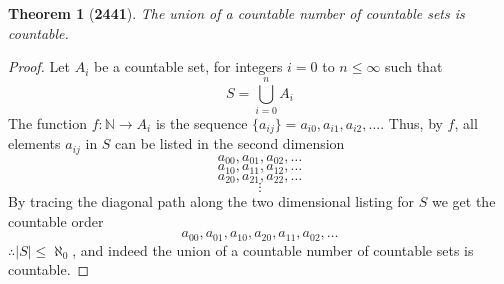 \documentclass[preview]{standalone}
\newtheorem{theorem}{Theorem}
\begin{document}
\begin{theorem}[\textbf{2441}]
    The union of a countable number of countable sets is countable.
\end{theorem}

\begin{proof}
    Let $A_i$ be a countable set, for integers $i=0$ to $n \leq \infty$ 
    such that
    $$S = \bigcup_{i=0}^{n} A_i$$ 
    The function $f: \mathbb{N} \rightarrow A_i$ is the sequence 
    $\{a_{ij}\} = a_{i0}, a_{i1}, a_{i2}, \dots$. 
    Thus, by $f$, all elements $a_{ij}$ in $S$ can be listed in the second dimension
    $$a_{00}, a_{01}, a_{02}, \dots$$
    $$a_{10}, a_{11}, a_{12}, \dots$$
    $$a_{20}, a_{21}, a_{22}, \dots$$
    $$\vdots$$
    By tracing the diagonal path along the two 
    dimensional listing for $S$ we get the countable order 
    $$a_{00}, a_{01}, a_{10}, a_{20}, a_{11}, a_{02}, \dots$$
    $\therefore |S| \leq \aleph_0$, and indeed the union of a countable number of 
    countable sets is countable.
\end{proof}
\end{document}
